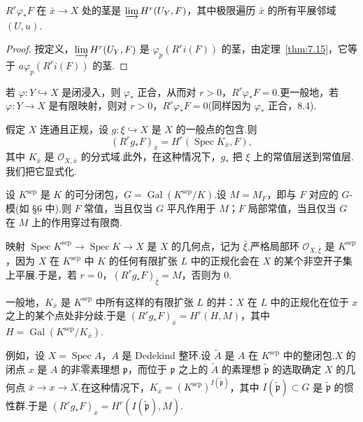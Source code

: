 \begin{corollary}\label{cor:12.2}
$R^{r}\varphi_{*}F$ 在 $\bar{x} \to X$ 处的茎是 $\varinjlim H^{r}(U_Y, F)$，其中极限遍历 $\bar{x}$ 的所有平展邻域 $(U, u)$.
\end{corollary}

\begin{proof}
按定义，$\varinjlim H^{r}(U_Y, F)$ 是 $\varphi_{p}(R^{r}i(F))$ 的茎，由定理~\ref{thm:7.15}，它等于 $a\varphi_{p}(R^{r}i(F))$ 的茎.
\end{proof}

\begin{example}\label{ex:12.3}
若 $\varphi \colon Y \hookrightarrow X$ 是闭浸入，则 $\varphi_{*}$ 正合，从而对 $r > 0$，$R^{r}\varphi_{*}F = 0$.更一般地，若 $\varphi \colon Y \to X$ 是有限映射，则对 $r > 0$，$R^{r}\varphi_{*}F = 0$(同样因为 $\varphi_{*}$ 正合，8.4).
\end{example}

\begin{example}\label{ex:12.4}
假定 $X$ 连通且正规，设 $g \colon \xi \hookrightarrow X$ 是 $X$ 的一般点的包含.则
\[
(R^{r}g_{*}F)_{\bar{x}} = H^{r}(\operatorname{Spec} K_{\bar{x}}, F),
\]
其中 $K_{\bar{x}}$ 是 $\mathcal{O}_{X, \bar{x}}$ 的分式域.此外，在这种情况下，$g_{*}$ 把 $\xi$ 上的常值层送到常值层.我们把它显式化.

设 $K^{\mathrm{sep}}$ 是 $K$ 的可分闭包，$G = \operatorname{Gal}(K^{\mathrm{sep}}/K)$.设 $M = M_F$，即与 $F$ 对应的 $G$-模(如 \S 6 中).则 $F$ 常值，当且仅当 $G$ 平凡作用于 $M$；$F$ 局部常值，当且仅当 $G$ 在 $M$ 上的作用穿过有限商.

映射 $\operatorname{Spec} K^{\mathrm{sep}} \to \operatorname{Spec} K \to X$ 是 $X$ 的几何点，记为 $\bar{\xi}$.严格局部环 $\mathcal{O}_{X, \bar{\xi}}$ 是 $K^{\mathrm{sep}}$，因为 $X$ 在 $K^{\mathrm{sep}}$ 中 $K$ 的任何有限扩张 $L$ 中的正规化会在 $X$ 的某个非空开子集上平展.于是，若 $r = 0$，$(R^{r}g_{*}F)_{\bar{\xi}} = M$，否则为 0.

一般地，$K_{\bar{x}}$ 是 $K^{\mathrm{sep}}$ 中所有这样的有限扩张 $L$ 的并：$X$ 在 $L$ 中的正规化在位于 $x$ 之上的某个点处非分歧.于是 $(R^{r}g_{*}F)_{\bar{x}} = H^{r}(H, M)$，其中 $H = \operatorname{Gal}(K^{\mathrm{sep}}/K_{\bar{x}})$.

例如，设 $X = \operatorname{Spec} A$，$A$ 是 Dedekind 整环.设 $\widetilde{A}$ 是 $A$ 在 $K^{\mathrm{sep}}$ 中的整闭包.$X$ 的闭点 $x$ 是 $A$ 的非零素理想 $\mathfrak{p}$，而位于 $\mathfrak{p}$ 之上的 $\widetilde{A}$ 的素理想 $\widetilde{\mathfrak{p}}$ 的选取确定 $X$ 的几何点 $\bar{x} \to x \to X$.在这种情况下，$K_{\bar{x}} = (K^{\mathrm{sep}})^{I(\widetilde{\mathfrak{p}})}$，其中 $I(\widetilde{\mathfrak{p}}) \subset G$ 是 $\widetilde{\mathfrak{p}}$ 的惯性群.于是 $(R^{r}g_{*}F)_{\bar{x}} = H^{r}(I(\widetilde{\mathfrak{p}}), M)$.
\end{example}

